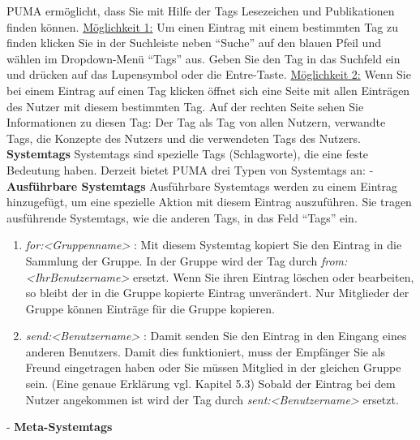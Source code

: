 \documentclass[b5paper,11pt,twoside]{scrbook} %
\begin{document}
PUMA ermöglicht, dass Sie mit Hilfe der Tags Lesezeichen und Publikationen finden können. \newline\newline
\underline{Möglichkeit 1:} Um einen Eintrag mit einem bestimmten Tag zu finden klicken Sie in der Suchleiste neben \enquote{Suche} auf den blauen Pfeil und wählen im Dropdown-Menü \enquote{Tags} aus. Geben Sie den Tag in das Suchfeld ein und drücken auf das Lupensymbol oder die Entre-Taste.\newline \newline
\underline{Möglichkeit 2:} Wenn Sie bei einem Eintrag auf einen Tag klicken öffnet sich eine Seite mit allen Einträgen des Nutzer mit diesem bestimmten Tag. Auf der rechten Seite sehen Sie Informationen zu diesen Tag: Der Tag als Tag von allen Nutzern, verwandte Tags, die Konzepte des Nutzers und die verwendeten Tags des Nutzers. 
\newline
\newline
\textbf{Systemtags}
\newline
Systemtags sind spezielle Tags (Schlagworte), die eine feste Bedeutung haben. Derzeit bietet PUMA drei Typen von Systemtags an: \newline\newline
- \textbf{Ausführbare Systemtags}\newline
Ausführbare Systemtags werden zu einem Eintrag hinzugefügt, um eine spezielle Aktion mit diesem Eintrag auszuführen. Sie tragen ausführende Systemtags, wie die anderen Tags, in das Feld \enquote{Tags} ein. 
\begin{enumerate}
    \item \textit{for:<Gruppenname>} : Mit diesem Systemtag kopiert Sie den Eintrag in die Sammlung der Gruppe. In der Gruppe wird der Tag durch \textit{from:<IhrBenutzername>} ersetzt. Wenn Sie ihren Eintrag löschen oder bearbeiten, so bleibt der in die Gruppe kopierte Eintrag unverändert. Nur Mitglieder der Gruppe können Einträge für die Gruppe kopieren.
    \item \textit{send:<Benutzername>} : Damit senden Sie den Eintrag in den Eingang eines anderen Benutzers. Damit dies funktioniert, muss der Empfänger Sie als Freund eingetragen haben oder Sie müssen Mitglied in der gleichen Gruppe sein. (Eine genaue Erklärung vgl. Kapitel 5.3) Sobald der Eintrag bei dem Nutzer angekommen ist wird der Tag durch \textit{sent:<Benutzername>} ersetzt.
\end{enumerate}
- \textbf{Meta-Systemtags}
\newline   
\end{document}

